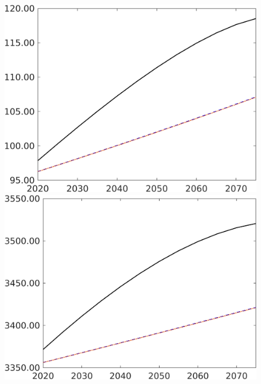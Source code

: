 \begin{figure}[h!!]
\begin{minipage}[]{0.32\textwidth}
	\end{minipage}
	\begin{minipage}[]{0.32\textwidth}
		\includegraphics[width=1\textwidth]{../../codding_model/own_basedOnFried/optimalPol_elastS_DisuSci/figures/all_1705/Ag_CompEffOPT_NOT_NoTaus_spillover0_noskill1_sep1_BN0_ineq0_red0_etaa0.79_lgd0.png}
	\end{minipage}
	\begin{minipage}[]{0.32\textwidth}
		\includegraphics[width=1\textwidth]{../../codding_model/own_basedOnFried/optimalPol_elastS_DisuSci/figures/all_1705/Af_CompEffOPT_NOT_NoTaus_spillover0_noskill1_sep1_BN0_ineq0_red0_etaa0.79_lgd0.png}

\end{minipage}
\end{figure}
